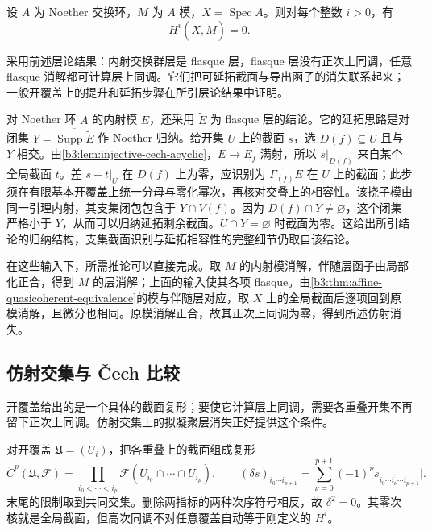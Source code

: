 \begin{theorem}[仿射拟凝聚层的上同调消失]\label{b3:thm:affine-quasicoherent-vanishing}
	设 \(A\) 为 Noether 交换环，\(M\) 为 \(A\) 模，\(X=\operatorname{Spec}A\)。则对每个整数 \(i>0\)，有
	\[
		H^i(X,\widetilde M)=0.
	\]
\end{theorem}
\begin{proofsketch}
	采用前述层论结果：内射交换群层是 flasque 层，flasque 层没有正次上同调，任意 flasque 消解都可计算层上同调。它们把可延拓截面与导出函子的消失联系起来；一般开覆盖上的提升和延拓步骤在所引层论结果中证明。

	对 Noether 环 \(A\) 的内射模 \(E\)，还采用 \(\widetilde E\) 为 flasque 层的结论\cite[Chapter III, Proposition 3.4, pp. 214--215]{Hartshorne1977}。它的延拓思路是对闭集 \(Y=\overline{\operatorname{Supp}\widetilde E}\) 作 Noether 归纳。给开集 \(U\) 上的截面 \(s\)，选 \(D(f)\subseteq U\) 且与 \(Y\) 相交。由\cref{b3:lem:injective-cech-acyclic}，\(E\to E_f\) 满射，所以 \(s|_{D(f)}\) 来自某个全局截面 \(t\)。差 \(s-t|_U\) 在 \(D(f)\) 上为零，应识别为 \(\widetilde{\Gamma_{(f)}E}\) 在 \(U\) 上的截面；此步须在有限基本开覆盖上统一分母与零化幂次，再核对交叠上的相容性。该挠子模由同一引理内射，其支集闭包包含于 \(Y\cap V(f)\)。因为 \(D(f)\cap Y\ne\varnothing\)，这个闭集严格小于 \(Y\)，从而可以归纳延拓剩余截面。\(U\cap Y=\varnothing\) 时截面为零。这给出所引结论的归纳结构，支集截面识别与延拓相容性的完整细节仍取自该结论。

	在这些输入下，所需推论可以直接完成。取 \(M\) 的内射模消解，伴随层函子由局部化正合，得到 \(\widetilde M\) 的层消解；上面的输入使其各项 flasque。由\cref{b3:thm:affine-quasicoherent-equivalence}的模与伴随层对应，取 \(X\) 上的全局截面后逐项回到原模消解，且微分也相同。原模消解正合，故其正次上同调为零，得到所述仿射消失。
\end{proofsketch}

\subsection{仿射交集与 Čech 比较}
\label{b3:subsec:2405:cech-comparison}
\label{b3:subsec:2405:02}

开覆盖给出的是一个具体的截面复形；要使它计算层上同调，需要各重叠开集不再留下正次上同调。仿射交集上的拟凝聚层消失正好提供这个条件。

\ProseParagraphBreak
对开覆盖 \(\mathfrak U=(U_i)\)，把各重叠上的截面组成复形
\[
	\check C^p(\mathfrak U,\mathcal F) =\prod_{i_0<\cdots<i_p}\mathcal F(U_{i_0}\cap\cdots\cap U_{i_p}), \qquad (\delta s)_{i_0\cdots i_{p+1}} =\sum_{\nu=0}^{p+1}(-1)^\nu s_{i_0\cdots\widehat{i_\nu}\cdots i_{p+1}}|.
\]
末尾的限制取到共同交集。删除两指标的两种次序符号相反，故 \(\delta^2=0\)。其零次核就是全局截面，但高次同调不对任意覆盖自动等于刚定义的 \(H^i\)。

